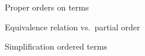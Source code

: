 \documentclass{clseminar}
\begin{document}
\providecommand{\ctx}{C}
\providecommand{\ctxhole}{[]}

\begin{figure}
    \begin{center}

\caption{Proper orders on terms}
    \end{center}
\end{figure}

\begin{figure}
    \begin{center}

\caption{Equivalence relation vs.~partial order}
\end{center}
\end{figure}

\providecommand{\ma}{a}
\providecommand{\mb}{b}
\providecommand{\mc}{c}
\providecommand{\mf}{f}
\providecommand{\mcT}{T}

\begin{figure}
    \begin{center}
        
\caption{Simplification ordered terms}
\end{center}
\end{figure}
\end{document}
